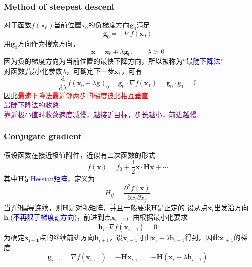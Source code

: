 \documentclass[cjk,slidestop,compress,mathserif,blue]{beamer}
\begin{document}
\frame
{
	\frametitle{\textrm{Method of steepest descent}}
	对于函数$f(\mathbf{x}_0)$当前位置$\mathbf{x}_0$的负梯度方向$\mathbf{g}_0$满足
	\begin{displaymath}
		\mathbf{g}_0=-\nabla f(\mathbf{x}_0)
	\end{displaymath}
	用$\mathbf{g}_0$方向作为搜索方向，
	\begin{displaymath}
		\mathbf{x}=\mathbf{x}_0+\lambda\mathbf{g}_0,\qquad \lambda>0
	\end{displaymath}
	因为负的梯度方向为当前位置的最快下降方向，所以被称为“\textcolor{blue}{最陡下降法}”\\
	对函数$f$最小化参数$\lambda$，可确定下一步$\mathbf{x}_1$，可有
	\begin{displaymath}
		\dfrac{\mathrm{d}}{\mathrm{d}\lambda}f(\mathbf{x}_0+\lambda\mathbf{g})_0=\mathbf{g}_0\cdot\nabla f(\mathbf{x}_1)=\mathbf{g}_0\cdot\mathbf{g}_1=0
	\end{displaymath}
	因此\textcolor{red}{最速下降法最近邻两步的梯度彼此相互垂直}\\
	\textcolor{purple}{最陡下降法的收敛:~\\靠近极小值时收敛速度减慢，越接近目标，步长越小，前进越慢}
}

\frame
{
	\frametitle{\textrm{Conjugate gradient}}
	假设函数在接近极值附件，近似有二次函数的形式
	\begin{displaymath}
		f(\mathbf{x})=f_0+\frac12\mathbf{x}\cdot\mathbf{H}{\mathbf{x}}+\cdots
	\end{displaymath}
	其中$\mathbf{H}$是\textcolor{blue}{\textrm{Hessian}矩阵}，定义为
	\begin{displaymath}
		H_{ij}=\dfrac{\partial^2f(\mathbf{x})}{\partial x_i\partial x_j}
	\end{displaymath}
	当$f$的偏导连续，则$\mathbf{H}$是对称矩阵，并且一般要求$\mathbf{H}$是正定的
	\vskip 20pt
	设从点$\mathbf{x}_i$出发沿方向$\mathbf{h}_i$(\textcolor{blue}{不再限于梯度$\mathbf{g}_i$方向})，前进到点$\mathbf{x}_{i+1}$，由根据最小化要求
	\begin{displaymath}
		\mathbf{h}_i\cdot\nabla f(\mathbf{x}_{i+1})=0
	\end{displaymath}
	为确定$\mathbf{x_{i+1}}$点的继续前进方向$\mathbf{h}_{i+1}$，设$\mathbf{x}_{i+1}$可由$\mathbf{x}_i+\lambda\mathbf{h}_{i+1}$得到，因此$\mathbf{x}_{i+1}$的梯度
	\begin{displaymath}
		\mathbf{g}_{i+1}=\nabla f(\mathbf{x}_{i+1})=-\mathbf{H}\mathbf{x}_{i+1}=-\mathbf{H}(\mathbf{x}_{i}+\lambda\mathbf{h}_{i+1})
	\end{displaymath}
}
\end{document}
